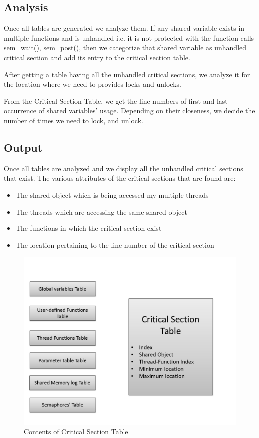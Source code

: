 \subsection{Analysis}
Once all tables are generated we analyze them. If any shared variable exists in multiple functions and is unhandled i.e. it is not protected with the function calls sem\_wait(), sem\_post(), then we categorize that shared variable as unhandled critical section and add its entry to the critical section table.

After getting a table having all the unhandled critical sections, we analyze it for the location where we need to provides locks and unlocks. 

From the Critical Section Table, we get the line numbers of first and last occurrence of shared variables’ usage. Depending on their closeness, we decide the number of times we need to lock, and unlock.

\subsection{Output}
Once all tables are analyzed and we display all the unhandled critical sections that exist. The various attributes of the critical sections that are found are: 
\begin{itemize}

\item The shared object which is being accessed my multiple threads

\item The threads which are accessing the same shared object

\item The functions in which the critical section exist

\item The location pertaining to the line number of the critical section

\end{itemize}

\begin{figure}[H]
\centering
\includegraphics[scale=0.5]{cs.png}
\caption{Contents of Critical Section Table}
\label{<<Label>>}
\end{figure}

